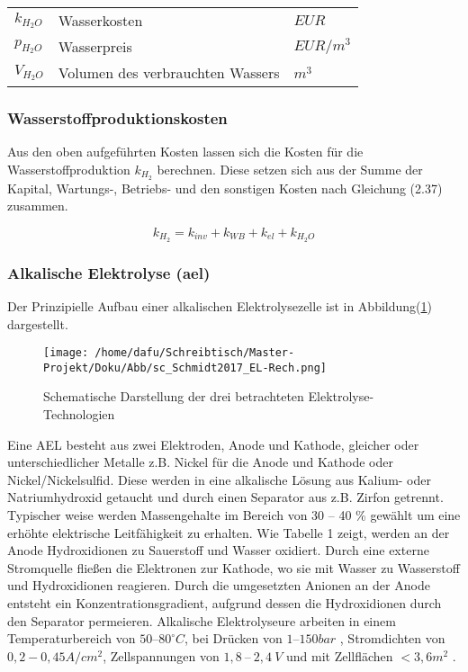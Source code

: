 \documentclass[onecolumn,10pt,titlepage]{article}
\begin{document}
				\begin{table}[H]
					\begin{tabular*}{\textwidth}{lll}
					$k_{H_2O}$&	Wasserkosten	&$EUR$\\
					$p_{H_2O}$&Wasserpreis		&$EUR/m^3$\\
					$V_{H_2O}$&Volumen des verbrauchten Wassers&$m^3$\\
				\end{tabular*}
			\end{table}

			\subsubsection*{Wasserstoffproduktionskosten}
			Aus den oben aufgeführten Kosten lassen sich die Kosten für die Wasserstoffproduktion $k_{H_2}$ berechnen. Diese setzen sich aus der Summe der Kapital, Wartungs-, Betriebs- und den sonstigen Kosten nach Gleichung (2.37) zusammen.

			\begin{equation}
			k_{H_2} = k_{inv}+k_{WB}+k_{el}+k_{H_2O}
			\end{equation}


			\subsubsection*{Alkalische Elektrolyse (\gls{ael})}
			Der Prinzipielle Aufbau einer alkalischen Elektrolysezelle ist in Abbildung(\ref{fig:schem_EL}) dargestellt.

			\begin{figure}[H]
				\centering
				\texttt{[image: /home/dafu/Schreibtisch/Master-Projekt/Doku/Abb/sc\_Schmidt2017\_EL-Rech.png]}
				\caption[Schematische Darstellung Elektrolyse-Technologien]{Schematische Darstellung der drei betrachteten Elektrolyse-Technologien}
				\label{fig:schem_EL}
			\end{figure}

			Eine AEL besteht aus zwei Elektroden, Anode und Kathode, gleicher oder unterschiedlicher Metalle z.B. Nickel für die Anode und Kathode oder Nickel/Nickelsulfid.\cite{Kurzweil.2015} Diese werden in eine alkalische Lösung aus Kalium- oder Natriumhydroxid getaucht und durch einen Separator aus z.B. Zirfon getrennt. Typischer weise werden Massengehalte im Bereich von 30 – 40 \% gewählt \cite{Ghaib.2017} um eine erhöhte elektrische Leitfähigkeit zu erhalten. Wie Tabelle 1 zeigt, werden an der Anode Hydroxidionen zu Sauerstoff und Wasser oxidiert. Durch eine externe Stromquelle fließen die Elektronen zur Kathode, wo sie mit Wasser zu Wasserstoff und Hydroxidionen reagieren. Durch die umgesetzten Anionen an der Anode entsteht ein Konzentrationsgradient, aufgrund dessen die Hydroxidionen durch den Separator permeieren.
			Alkalische Elektrolyseure arbeiten in einem Temperaturbereich von $50–80 ^\circ C$, bei Drücken von $1–150 bar$ , Stromdichten von $0,2 - 0,45 A/cm^2$, Zellspannungen von $1,8~–~2,4~ V$ \cite{Kurzweil.2015} und mit Zellflächen $< 3,6 m^2$\cite{Buttler.2018} .
\end{document}
